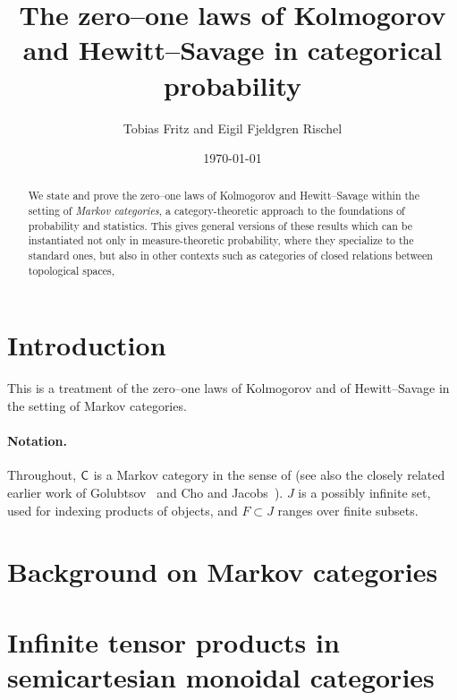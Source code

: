 \documentclass[11pt]{article}
\author{Tobias Fritz and Eigil Fjeldgren Rischel}
\title{The zero--one laws of Kolmogorov and Hewitt--Savage in categorical probability}
\date{\today}
\begin{document}
\maketitle

\begin{abstract}
	We state and prove the zero--one laws of Kolmogorov and Hewitt--Savage within the setting of \emph{Markov categories}, a category-theoretic approach to the foundations of probability and statistics. This gives general versions of these results which can be instantiated not only in measure-theoretic probability, where they specialize to the standard ones, but also in other contexts such as categories of closed relations between topological spaces, 
\end{abstract}

\tableofcontents

\section{Introduction}

This is a treatment of the zero--one laws of Kolmogorov and of Hewitt--Savage in the setting of Markov categories.

\paragraph*{Notation.} 

Throughout, $\mathsf{C}$ is a Markov category in the sense of \cite[Definition~2.1]{markov_cats} (see also the closely related earlier work of Golubtsov~\cite{golubtsov} and Cho and Jacobs~\cite{cho_jacobs}). $J$ is a possibly infinite set, used for indexing products of objects, and $F \subset J$ ranges over finite subsets.

\section{Background on Markov categories}


\section{Infinite tensor products in semicartesian monoidal categories}
\end{document}
